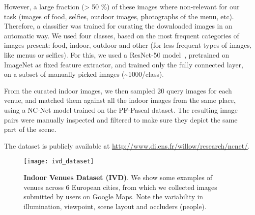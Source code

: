 \documentclass{article}
\begin{document}
However, a large fraction (> 50 \%) 
of these images where non-relevant for our task (images of food, selfies, outdoor images, photographs of the menu, etc). Therefore, a classifier was trained for curating the downloaded images in an automatic way. We used four classes, based on the most frequent categories of images present: food, indoor, outdoor and other (for less frequent types of images, like menus or selfies). For this, we used a ResNet-50 model~\cite{he2016deep}, pretrained on ImageNet as fixed feature extractor, and trained only the fully connected layer, on a subset of manually picked images (\textasciitilde{}1000/class). 

From the curated indoor images, we then sampled 20 query images for each venue, and matched them against all the indoor images from the same place, using a NC-Net model trained on the PF-Pascal dataset. The resulting image pairs were manually inspected and filtered to make sure they depict the same part of the scene. 

The dataset is publicly available at \url{http://www.di.ens.fr/willow/research/ncnet/}.

\begin{figure}[tbp]
  \centering
  \texttt{[image: ivd\_dataset]}
\caption{{\bf Indoor Venues Dataset (IVD)}. We show some examples of venues across 6 European cities, from which we collected images submitted by users on Google Maps. Note the variability in illumination, viewpoint, scene layout and occluders (people).}
  \label{fig:ivd-dataset}
\end{figure}
\end{document}
